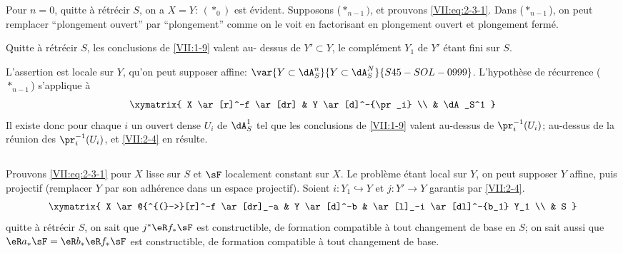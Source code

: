 Pour $n=0$, quitte à rétrécir $S$, on a $X=Y$: $(\ast_0)$ est évident. 
Supposons ($\ast_{n-1})$, et prouvons \eqref{VII:eq:2-3-1}. Dans 
($\ast_{n-1}$), on peut remplacer ``plongement ouvert'' par ``plongement'' 
comme on le voit en factorisant en plongement ouvert et plongement fermé. 





\begin{lemma_}\label{VII:2-4}
Quitte à rétrécir $S$, les conclusions de \ref{VII:1-9} valent au-
dessus de $Y'\subset Y$, le complément $Y_1$ de $Y'$ étant fini sur $S$. 
\end{lemma_}

L'assertion est locale sur $Y$, qu'on peut supposer affine: $\var{Y\subset \dA_S^n}{Y\subset \dA_S^N}{S45-SOL-0999}$. 
L'hypothèse de récurrence ($\ast_{n-1}$) s'applique à 
\[\xymatrix{
  X \ar[r]^-f \ar[dr] 
    & Y \ar[d]^-{\pr_i} \\
  & \dA_S^1 
}\]
Il existe donc pour chaque $i$ un ouvert dense $U_i$ de $\dA_S^1$ tel que les 
conclusions de \ref{VII:1-9} valent au-dessus de $\pr_i^{-1}(U_i)$;  
au-dessus de la réunion des $\pr_i^{-1}(U_i)$, et \ref{VII:2-4} en résulte. 





\addtocounter{subsection}{1} %
\subsection{}\label{VII:2-6}

Prouvons \eqref{VII:eq:2-3-1} pour $X$ lisse sur $S$ et $\sF$ localement 
constant sur $X$. Le problème étant local sur $Y$, on peut supposer $Y$ 
affine, puis projectif (remplacer $Y$ par son adhérence dans un espace 
projectif). Soient $i:Y_1\hookrightarrow Y$ et $j:Y' \to Y$ garantis par 
\ref{VII:2-4}. 
\[\xymatrix{
  X \ar@{^{(}->}[r]^-f \ar[dr]_-a 
    & Y \ar[d]^-b 
    & \ar[l]_-i \ar[dl]^-{b_1} Y_1 \\
  & S 
}\] 
quitte à rétrécir $S$, on sait que $j^\ast \eR f_\ast \sF$ est 
constructible, de formation compatible à tout changement de base en $S$; on 
sait aussi que $\eR a_\ast \sF = \eR b_\ast \eR f_\ast \sF$ est constructible, 
de formation compatible à tout changement de base. 

